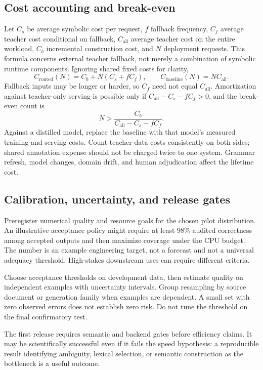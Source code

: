 \documentclass[11pt,a4paper]{article}
\begin{document}
\subsection{Cost accounting and break-even}
Let \(C_s\) be average symbolic cost per request, \(f\) fallback frequency,
\(C_f\) average teacher cost conditional on fallback, \(C_{\mathrm{all}}\)
average teacher cost on the entire workload, \(C_b\) incremental construction
cost, and \(N\) deployment requests. This formula concerns external teacher fallback, not merely a combination
of symbolic runtime components. Ignoring shared fixed costs for clarity,
\[
  C_{\mathrm{routed}}(N)=C_b+N(C_s+fC_f),\qquad
  C_{\mathrm{baseline}}(N)=NC_{\mathrm{all}}.
\]
Fallback inputs may be longer or harder, so \(C_f\) need not equal
\(C_{\mathrm{all}}\). Amortization against teacher-only serving is possible
only if \(C_{\mathrm{all}}-C_s-fC_f>0\), and the break-even count is
\[
  N>\frac{C_b}{C_{\mathrm{all}}-C_s-fC_f}.
\]
Against a distilled model, replace the baseline with that model's measured
training and serving costs. Count teacher-data costs consistently on both
sides; shared annotation expense should not be charged twice to one system.
Grammar refresh, model changes, domain drift, and human adjudication affect
the lifetime cost.

\subsection{Calibration, uncertainty, and release gates}
Preregister numerical quality and resource goals for the chosen pilot
distribution. An illustrative acceptance policy might require at least
98\% audited correctness among accepted outputs and then maximize coverage
under the CPU budget. The number is an example engineering target, not a
forecast and not a universal adequacy threshold. High-stakes downstream uses
can require different criteria.

Choose acceptance thresholds on development data, then estimate quality on
independent examples with uncertainty intervals. Group resampling by source
document or generation family when examples are dependent. A small set with
zero observed errors does not establish zero risk. Do not tune the threshold
on the final confirmatory test.

The first release requires semantic and backend gates before efficiency
claims. It may be scientifically successful even if it fails the speed
hypothesis: a reproducible result identifying ambiguity, lexical selection,
or semantic construction as the bottleneck is a useful outcome.
\end{document}
